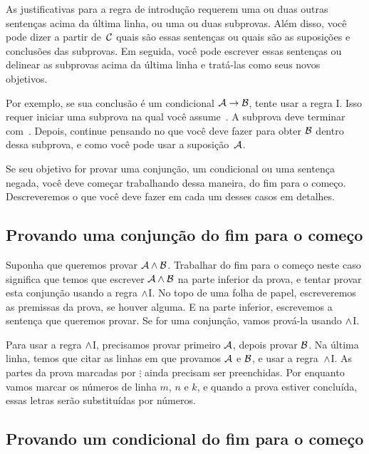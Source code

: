 As justificativas para a regra de introdução requerem uma ou duas outras sentenças acima da última linha, ou uma ou duas subprovas. Além disso, você pode dizer a partir de~$\mathcal{C}$ quais são essas sentenças ou quais são as suposições e conclusões das subprovas. Em seguida, você pode escrever essas sentenças ou delinear as subprovas acima da última linha e tratá-las como seus novos objetivos.

 Por exemplo, se sua conclusão é um condicional $\mathcal{A}\rightarrow\mathcal{B}$,  tente usar a regra {\eif}I.  Isso requer iniciar uma subprova na qual você assume~. A subprova deve terminar com~. Depois, continue pensando no que você deve fazer para obter $\mathcal{B}$ dentro dessa subprova,  e como você pode usar a suposição~$\mathcal{A}$.

 Se seu objetivo for provar uma conjunção, um condicional ou uma sentença negada, você deve começar trabalhando dessa maneira, do fim para o começo. Descreveremos o que você deve fazer em cada um desses casos em detalhes.
 
\subsection*{Provando uma conjunção do fim para o começo}

Suponha que queremos provar $\mathcal{A} \wedge \mathcal{B}$. Trabalhar do fim para o começo neste caso significa que temos que escrever $\mathcal{A} \wedge \mathcal{B}$ na parte inferior da prova, e tentar provar esta conjunção usando a regra  $\wedge$I.
No topo de uma folha de papel, escreveremos as premissas  da prova, se houver alguma. E  na parte inferior, escrevemos a sentença que queremos provar. Se for uma conjunção, vamos prová-la usando $\wedge$I.
  \begin{fitchproof}
	\ellipsesline 
\ellipsesline
    \ellipsesline 
  \end{fitchproof}
Para usar a regra  $\wedge$I, precisamos provar primeiro $\mathcal{A}$, depois provar $\mathcal{B}$. Na última linha, temos que citar as linhas em que provamos $\mathcal{A}$ e  $\mathcal{B}$, e usar a regra~$\wedge$I. As partes da prova marcadas por $\vdots$ ainda precisam ser preenchidas.
Por enquanto vamos marcar os números de linha $m$, $n$ e $k$, e quando a prova estiver concluída, essas letras serão substituídas por números.

\subsection*{Provando um condicional do fim para o começo}

